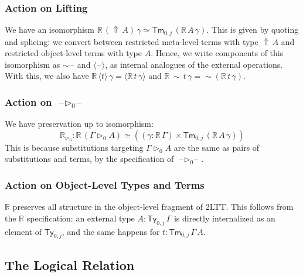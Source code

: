 \documentclass[acmsmall,screen]{acmart}
\newcommand{\msf}[1]{\mathsf{#1}}
\newcommand{\mbb}[1]{\mathbb{#1}}
\newcommand{\ext}{\triangleright}
\newcommand{\Lift}{{\Uparrow}}
\newcommand{\spl}{{\sim}}
\newcommand{\qut}[1]{\langle #1\rangle}
\newcommand{\Ty}{\msf{Ty}}
\newcommand{\Tm}{\msf{Tm}}
\newcommand{\blank}{{\mathord{\hspace{1pt}\text{--}\hspace{1pt}}}}
\newcommand{\re}{\mbb{R}}
\theoremstyle{remark}
\begin{document}
\subsubsection{Action on Lifting} We have an isomorphism $\re\,(\Lift\,A)\,\gamma \simeq
\Tm_{0,j}\,(\re\,A\,\gamma)$. This is given by quoting and splicing: we convert
between restricted meta-level terms with type $\Lift\,A$ and restricted
object-level terms with type $A$. Hence, we write components of this isomorphism
as $\spl\blank$ and $\qut{\blank}$, as internal analogues of the external
operations. With this, we also have $\re\,\qut{t}\,\gamma =
\qut{\re\,t\,\gamma}$ and $\re\,\spl\,t\,\gamma = \spl(\re\,t\,\gamma)$.

\subsubsection{Action on $\blank\ext_0\blank$} We have preservation up to isomorphism:
\[
  \re_{\ext_0} : \re\,(\Gamma \ext_0 A) \simeq ((\gamma : \re\,\Gamma)\times \Tm_{0,j}\,(\re\,A\,\gamma))
\]
This is because substitutions targeting $\Gamma \ext_0 A$ are the same as
pairs of substitutions and terms, by the specification of $\blank\!\ext_0\!\blank$.

\subsubsection{Action on Object-Level Types and Terms} $\re$ preserves all structure
in the object-level fragment of 2LTT. This follows from the $\re$ specification:
an external type $A : \Ty_{0,j}\,\Gamma$ is directly internalized as an element
of $\Ty_{0,j}$, and the same happens for $t : \Tm_{0,j}\,\Gamma\,A$.


\subsection{The Logical Relation}
\end{document}
